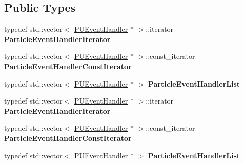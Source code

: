 \subsection*{Public Types}
\begin{DoxyCompactItemize}
\item 
\mbox{\label{classPUObserver_ac2d89deb46c92abf19c0534b5c325d60}} 
typedef std\+::vector$<$ \hyperlink{classPUEventHandler}{P\+U\+Event\+Handler} $\ast$ $>$\+::iterator {\bfseries Particle\+Event\+Handler\+Iterator}
\item 
\mbox{\label{classPUObserver_a92bf7f9dc5ee99bd687c2bbfab71bf26}} 
typedef std\+::vector$<$ \hyperlink{classPUEventHandler}{P\+U\+Event\+Handler} $\ast$ $>$\+::const\+\_\+iterator {\bfseries Particle\+Event\+Handler\+Const\+Iterator}
\item 
\mbox{\label{classPUObserver_a1245519223dd1f3f0661a5f13705a8cf}} 
typedef std\+::vector$<$ \hyperlink{classPUEventHandler}{P\+U\+Event\+Handler} $\ast$ $>$ {\bfseries Particle\+Event\+Handler\+List}
\item 
\mbox{\label{classPUObserver_ac2d89deb46c92abf19c0534b5c325d60}} 
typedef std\+::vector$<$ \hyperlink{classPUEventHandler}{P\+U\+Event\+Handler} $\ast$ $>$\+::iterator {\bfseries Particle\+Event\+Handler\+Iterator}
\item 
\mbox{\label{classPUObserver_a92bf7f9dc5ee99bd687c2bbfab71bf26}} 
typedef std\+::vector$<$ \hyperlink{classPUEventHandler}{P\+U\+Event\+Handler} $\ast$ $>$\+::const\+\_\+iterator {\bfseries Particle\+Event\+Handler\+Const\+Iterator}
\item 
\mbox{\label{classPUObserver_a1245519223dd1f3f0661a5f13705a8cf}} 
typedef std\+::vector$<$ \hyperlink{classPUEventHandler}{P\+U\+Event\+Handler} $\ast$ $>$ {\bfseries Particle\+Event\+Handler\+List}
\end{DoxyCompactItemize}
